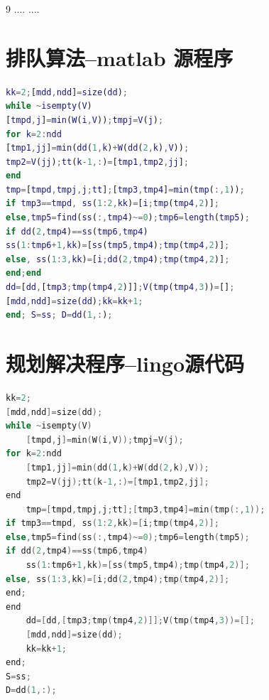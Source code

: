 \documentclass{cumcmthesis}
\begin{document}
\begin{thebibliography}{9}%
  ....
  ....
\end{thebibliography}

\newpage
\begin{appendices}
\section{排队算法--matlab 源程序}
\begin{lstlisting}[language=matlab]
kk=2;[mdd,ndd]=size(dd);
while ~isempty(V)
[tmpd,j]=min(W(i,V));tmpj=V(j);
for k=2:ndd
[tmp1,jj]=min(dd(1,k)+W(dd(2,k),V));
tmp2=V(jj);tt(k-1,:)=[tmp1,tmp2,jj];
end
tmp=[tmpd,tmpj,j;tt];[tmp3,tmp4]=min(tmp(:,1));
if tmp3==tmpd, ss(1:2,kk)=[i;tmp(tmp4,2)];
else,tmp5=find(ss(:,tmp4)~=0);tmp6=length(tmp5);
if dd(2,tmp4)==ss(tmp6,tmp4)
ss(1:tmp6+1,kk)=[ss(tmp5,tmp4);tmp(tmp4,2)];
else, ss(1:3,kk)=[i;dd(2,tmp4);tmp(tmp4,2)];
end;end
dd=[dd,[tmp3;tmp(tmp4,2)]];V(tmp(tmp4,3))=[];
[mdd,ndd]=size(dd);kk=kk+1;
end; S=ss; D=dd(1,:);
 \end{lstlisting}
 \section{规划解决程序--lingo源代码}
\begin{lstlisting}[language=c]
kk=2;
[mdd,ndd]=size(dd);
while ~isempty(V)
    [tmpd,j]=min(W(i,V));tmpj=V(j);
for k=2:ndd
    [tmp1,jj]=min(dd(1,k)+W(dd(2,k),V));
    tmp2=V(jj);tt(k-1,:)=[tmp1,tmp2,jj];
end
    tmp=[tmpd,tmpj,j;tt];[tmp3,tmp4]=min(tmp(:,1));
if tmp3==tmpd, ss(1:2,kk)=[i;tmp(tmp4,2)];
else,tmp5=find(ss(:,tmp4)~=0);tmp6=length(tmp5);
if dd(2,tmp4)==ss(tmp6,tmp4)
    ss(1:tmp6+1,kk)=[ss(tmp5,tmp4);tmp(tmp4,2)];
else, ss(1:3,kk)=[i;dd(2,tmp4);tmp(tmp4,2)];
end;
end
    dd=[dd,[tmp3;tmp(tmp4,2)]];V(tmp(tmp4,3))=[];
    [mdd,ndd]=size(dd);
    kk=kk+1;
end;
S=ss;
D=dd(1,:);
 \end{lstlisting}
\end{appendices}
\end{document}
